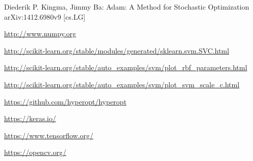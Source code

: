 \newpage
\begin{thebibliography}{9}
	Diederik P. Kingma, Jimmy Ba:
	Adam: A Method for Stochastic Optimization
	arXiv:1412.6980v9 [cs.LG]
	
	
	\url{http://www.numpy.org}
	

	\url{http://scikit-learn.org/stable/modules/generated/sklearn.svm.SVC.html}
	
	\url{http://scikit-learn.org/stable/auto_examples/svm/plot_rbf_parameters.html}
	
	\url{http://scikit-learn.org/stable/auto_examples/svm/plot_svm_scale_c.html}
	
	\url{https://github.com/hyperopt/hyperopt}
	
	\url{https://keras.io/}
	
	\url{https://www.tensorflow.org/}

	\url{https://opencv.org/}
	
\end{thebibliography}







